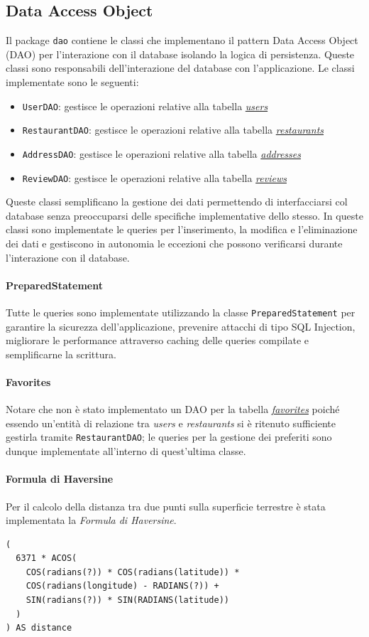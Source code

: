 \subsection{Data Access Object}
Il package \texttt{dao} contiene le classi che implementano 
il pattern Data Access Object (DAO) per l'interazione
con il database isolando la logica di persistenza.
Queste classi sono responsabili dell'interazione 
del database con l'applicazione.
Le classi implementate sono le seguenti:
\begin{itemize}
    \item \texttt{UserDAO}: gestisce le operazioni relative alla tabella \textit{\hyperref[sec:users]{users}}
    \item \texttt{RestaurantDAO}: gestisce le operazioni relative alla tabella \textit{\hyperref[sec:restaurants]{restaurants}}
    \item \texttt{AddressDAO}: gestisce le operazioni relative alla tabella \textit{\hyperref[sec:addresses]{addresses}}
    \item \texttt{ReviewDAO}: gestisce le operazioni relative alla tabella \textit{\hyperref[sec:reviews]{reviews}}
\end{itemize}
Queste classi semplificano la gestione dei dati permettendo 
di interfacciarsi col database senza preoccuparsi delle specifiche
implementative dello stesso. 
In queste classi sono implementate le queries per l'inserimento, 
la modifica e l'eliminazione dei dati e gestiscono in autonomia 
le eccezioni che possono verificarsi durante l'interazione
con il database.
\paragraph{PreparedStatement}
Tutte le queries sono implementate utilizzando la classe
\texttt{PreparedStatement} per garantire la sicurezza
dell'applicazione, prevenire attacchi di tipo SQL Injection, 
migliorare le performance attraverso caching delle queries compilate
e semplificarne la scrittura.
\paragraph{Favorites}
Notare che non è stato implementato un DAO per la tabella \textit{\hyperref[sec:favorites]{favorites}}
poiché essendo un'entità di relazione tra \textit{users} e \textit{restaurants} 
si è ritenuto sufficiente gestirla tramite \texttt{RestaurantDAO}; 
le queries per la gestione dei preferiti sono dunque implementate
all'interno di quest'ultima classe.
\paragraph{Formula di Haversine}
Per il calcolo della distanza tra due punti sulla superficie terrestre
è stata implementata la \textit{Formula di Haversine}.
\begin{verbatim}
(
  6371 * ACOS(
    COS(radians(?)) * COS(radians(latitude)) * 
    COS(radians(longitude) - RADIANS(?)) + 
    SIN(radians(?)) * SIN(RADIANS(latitude))
  )
) AS distance 
\end{verbatim}

